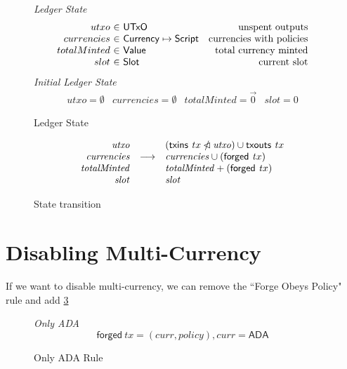 \documentclass[11pt,a4paper]{article}
\newcommand{\restrictdom}{\lhd}
\newcommand{\subtractdom}{\mathbin{\slashed{\restrictdom}}}
\newcommand{\union}{\cup}
\newcommand{\var}[1]{\mathit{#1}}
\newcommand{\fun}[1]{\mathsf{#1}}
\newcommand{\type}[1]{\mathsf{#1}}
\newcommand{\Slot}{\type{Slot}}
\newcommand{\Script}{\type{Script}}
\newcommand{\Currency}{\type{Currency}}
\newcommand{\Value}{\type{Value}}
\newcommand{\UTxO}{\type{UTxO}}
\newcommand{\txins}[1]{\fun{txins}\ \var{#1}}
\newcommand{\txouts}[1]{\fun{txouts}\ \var{#1}}
\newcommand{\forged}[1]{\fun{forged}\ \var{#1}}
\newcommand{\created}[1]{\fun{forged}\ \var{#1}}
\begin{document}
\begin{figure}

\emph{Ledger State}
%
\begin{equation*}
\begin{array}{r@{~\in~}lr}
utxo & \UTxO & \text{unspent outputs}
\\
currencies & \Currency \mapsto \Script
  & \text{currencies with policies}
\\
totalMinted & \Value & \text{total currency minted}
\\
slot & \Slot & \text{current slot}

\end{array}
\end{equation*}
\emph{Initial Ledger State}
%
\begin{equation*}
\begin{array}{llllll}
utxo = \emptyset
  & currencies = \emptyset
  & totalMinted = \vec{0}
  & slot = 0
\end{array}
\end{equation*}

\caption{Ledger State}
\label{fig:ledger_state}
\end{figure}

\begin{figure}
\begin{equation*}
  \begin{array}{rcl}
    \var{utxo} & & (\txins tx \subtractdom \var{utxo}) \union \txouts tx \\
    \var{currencies} & \longrightarrow & \var{currencies} \union (\created tx) \\
    \var{totalMinted} & & \var{totalMinted} + (\forged tx)\\
    \var{slot} & & \var{slot} \\
  \end{array}
\end{equation*}

\caption{State transition}
\label{fig:state_transition}
\end{figure}

\section{Disabling Multi-Currency}

If we want to disable multi-currency, we can remove the ``Forge Obeys Policy" rule and
add \cref{fig:only_ada_rule} 
\begin{figure}
\emph{Only ADA}
%
\begin{equation*}
\created tx = (curr, policy), curr = \mathsf{ADA}
\end{equation*}

\caption{Only ADA Rule}
\label{fig:only_ada_rule}
\end{figure}
\end{document}
